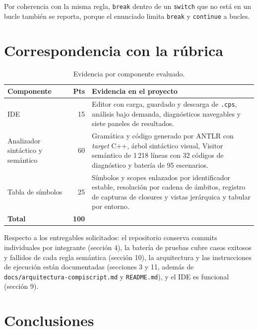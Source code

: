 \documentclass[11pt,a4paper]{article}
\begin{document}
Por coherencia con la misma regla, \texttt{break} dentro de un \texttt{switch}
que no está en un bucle también se reporta, porque el enunciado limita
\texttt{break} y \texttt{continue} a bucles.

\section{Correspondencia con la rúbrica}

\begin{table}[H]
\centering
\small
\begin{tabular}{@{}L{4.0cm}rL{8.6cm}@{}}
\toprule
\textbf{Componente} & \textbf{Pts} & \textbf{Evidencia en el proyecto} \\
\midrule
IDE & 15 &
Editor con carga, guardado y descarga de \texttt{.cps}, análisis bajo demanda,
diagnósticos navegables y siete paneles de resultados. \\
\addlinespace
Analizador sintáctico y semántico & 60 &
Gramática y código generado por ANTLR con \emph{target} C++, árbol sintáctico
visual, Visitor semántico de 1\,218 líneas con 32 códigos de diagnóstico y
batería de 95 escenarios. \\
\addlinespace
Tabla de símbolos & 25 &
Símbolos y scopes enlazados por identificador estable, resolución por cadena de
ámbitos, registro de capturas de closures y vistas jerárquica y tabular por
entorno. \\
\midrule
\textbf{Total} & \textbf{100} & \\
\bottomrule
\end{tabular}
\caption{Evidencia por componente evaluado.}
\end{table}

Respecto a los entregables solicitados: el repositorio conserva commits
individuales por integrante (sección 4), la batería de pruebas cubre casos
exitosos y fallidos de cada regla semántica (sección 10), la arquitectura y las
instrucciones de ejecución están documentadas (secciones 3 y 11, además de
\texttt{docs/arquitectura-compiscript.md} y \texttt{README.md}), y el IDE es
funcional (sección 9).

\section{Conclusiones}
\end{document}
